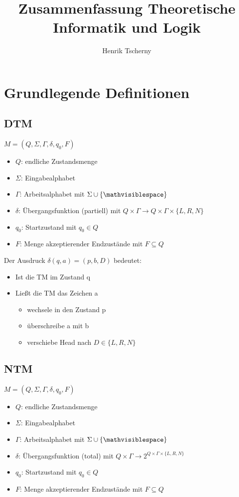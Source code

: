 \documentclass[12pt,a4paper]{article}
\title{Zusammenfassung Theoretische Informatik und Logik}
\author{Henrik Tscherny}
\begin{document}
\maketitle
\tableofcontents

\section{Grundlegende Definitionen}

\subsection{DTM}
$M = (Q,\Sigma,\Gamma,\delta,q_0,F)$
\begin{itemize}
\item $Q$: endliche Zustandsmenge
\item $\Sigma$: Eingabealphabet
\item $\Gamma$: Arbeitsalphabet mit $\Sigma \cup \{\mathvisiblespace \}$
\item $\delta$: Übergangsfunktion (partiell) mit $Q \times \Gamma \rightarrow Q \times \Gamma \times \{L,R,N\}$
\item $q_0$: Startzustand mit $q_0 \in Q$
\item $F$: Menge akzeptierender Endzustände mit $F \subseteq Q$
\end{itemize}

Der Ausdruck $\delta (q,a) = (p, b, D)$ bedeutet:
\begin{itemize}
\item Ist die TM im Zustand q
\item Ließt die TM das Zeichen a
\begin{itemize}
\item wechsele in den Zustand p
\item überschreibe a mit b
\item verschiebe Head nach $D \in \{L,R,N\}$
\end{itemize}
\end{itemize}

\subsection{NTM}
$M = (Q,\Sigma,\Gamma,\delta,q_0,F)$
\begin{itemize}
\item $Q$: endliche Zustandsmenge
\item $\Sigma$: Eingabealphabet
\item $\Gamma$: Arbeitsalphabet mit $\Sigma \cup \{\mathvisiblespace \}$
\item $\delta$: Übergangsfunktion (total) mit $Q \times \Gamma \rightarrow 2^{Q \times \Gamma \times \{L,R,N\}}$
\item $q_0$: Startzustand mit $q_0 \in Q$
\item $F$: Menge akzeptierender Endzustände mit $F \subseteq Q$
\end{itemize}
\flushleft
\end{document}
